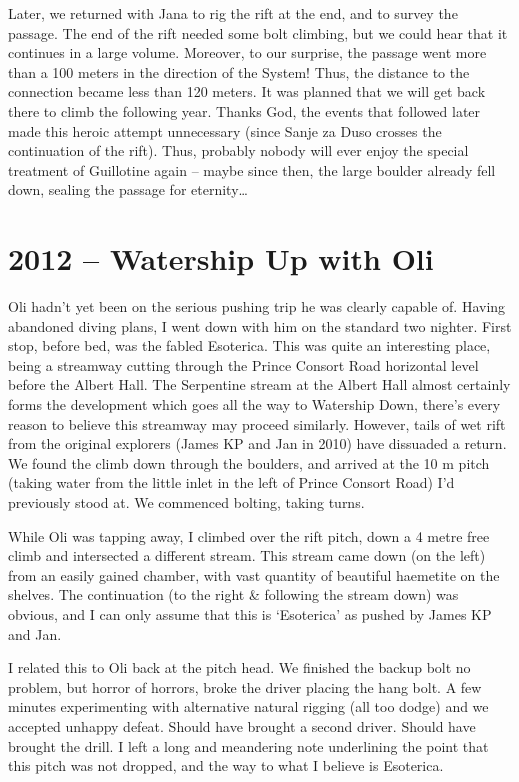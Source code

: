 Later, we returned with Jana to rig the rift at the end, and to survey
the passage. The end of the rift needed some bolt climbing, but we could
hear that it continues in a large volume. Moreover, to our surprise, the
passage went more than a 100 meters in the direction of the System!
Thus, the distance to the connection became less than 120 meters. It was
planned that we will get back there to climb the following year. Thanks
God, the events that followed later made this heroic attempt unnecessary
(since Sanje za Duso crosses the continuation of the rift). Thus,
probably nobody will ever enjoy the special treatment of Guillotine
again -- maybe since then, the large boulder already fell down, sealing
the passage for eternity\ldots{}


\hypertarget{watership-up-with-oli}{%
\section{2012 -- Watership Up with Oli}\label{watership-up-with-oli}}

Oli hadn't yet been on the serious pushing trip he was clearly capable
of. Having abandoned diving plans, I went down with him on the standard
two nighter. First stop, before bed, was the fabled Esoterica. This was
quite an interesting place, being a streamway cutting through the Prince
Consort Road horizontal level before the Albert Hall. The Serpentine
stream at the Albert Hall almost certainly forms the development which
goes all the way to Watership Down, there's every reason to believe this
streamway may proceed similarly. However, tails of wet rift from the
original explorers (James KP and Jan in 2010) have dissuaded a return.
We found the climb down through the boulders, and arrived at the 10 m
pitch (taking water from the little inlet in the left of Prince Consort
Road) I'd previously stood at. We commenced bolting, taking turns.

While Oli was tapping away, I climbed over the rift pitch, down a 4
metre free climb and intersected a different stream. This stream came
down (on the left) from an easily gained chamber, with vast quantity of
beautiful haemetite on the shelves. The continuation (to the right \&
following the stream down) was obvious, and I can only assume that this
is `Esoterica' as pushed by James KP and Jan.

I related this to Oli back at the pitch head. We finished the backup
bolt no problem, but horror of horrors, broke the driver placing the
hang bolt. A few minutes experimenting with alternative natural rigging
(all too dodge) and we accepted unhappy defeat. Should have brought a
second driver. Should have brought the drill. I left a long and
meandering note underlining the point that this pitch was not dropped,
and the way to what I believe is Esoterica.

